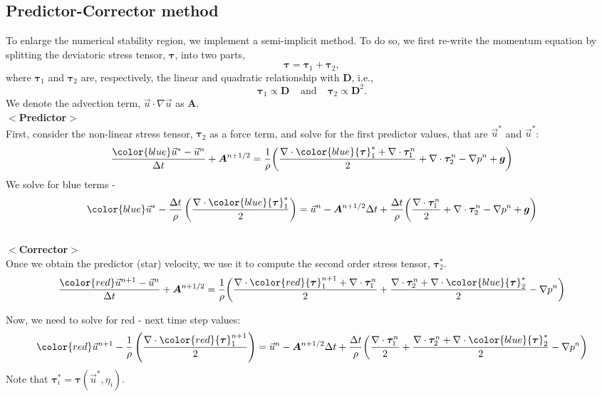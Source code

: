 \subsection{Predictor-Corrector method}
To enlarge the numerical stability region, we implement a semi-implicit method. To do so, we first re-write the momentum equation by splitting the deviatoric stress tensor, ${\bm \tau}$, into two parts, 
\[
 {\bm \tau}= {\bm \tau_1} + {\bm \tau_2},
\] 
where ${\bm \tau_1}$ and ${\bm \tau_2}$ are, respectively, the linear and quadratic relationship with ${\bm D}$, i.e., 
\[
  {\boldsymbol \tau_1} \propto \boldsymbol{D}
  \ \ \ \ \ \text{and}
   \ \ \ \ \ 
{\boldsymbol \tau_2} \propto {\boldsymbol D^2}.
\]
We denote the advection term, $\vec{u} \cdot \nabla \vec{u}$ as ${\bm A}$. 
\\
$<${\bf Predictor}$>$
\\
First, consider the non-linear stress tensor, ${\bm \tau_2}$ as a force term, and solve for the first predictor values, that are $\vec{u}^*$ and $\vec{u}^*$:
\[
\frac{{\color{blue}\vec{u}^*} - \vec{u}^n}{\Delta t} 
+  {\bm A}^{n+1/2} 
= \frac{1}{\rho}  \biggl(
\frac{\nabla \cdot {\color{blue}{\bm \tau}_1^*} + \nabla \cdot{\bm \tau}_1^n}{2} 
+ \nabla \cdot {\bm \tau}_2^n 
- \nabla p^n
+{\bm g}
\biggr)
\]
We solve for blue terms - 
\[
{\color{blue}\vec{u}^*} -
\frac{\Delta t}{\rho} 
\left( 
\frac{\nabla \cdot {\color{blue}{\bm \tau}_1^*}}{2}
\right)
=
\vec{u}^n
- {\bm A}^{n+1/2} \Delta t
+ \frac{\Delta t}{\rho} \biggl(
\frac{ \nabla \cdot{\bm \tau}_1^n}{2} 
+ \nabla \cdot {\bm \tau}_2^n 
- \nabla p^n
+{\bm g}
\biggr)
\]
\\
$<${\bf Corrector}$>$
\\
Once we obtain the predictor (star) velocity, we use it to compute the second order stress tensor, ${\bm \tau}_2^*$.
\[
\frac{{\color{red}\vec{u}^{n+1}} - \vec{u}^n}{\Delta t} 
+  {\bm A}^{n+1/2} 
=  \frac{1}{\rho}  \biggl(
\frac{\nabla \cdot {\color{red}{\bm \tau}_1^{n+1}} + \nabla \cdot{\bm \tau}_1^n}{2} 
+ \frac{\nabla \cdot {\bm \tau}_2^{n} + \nabla \cdot {\color{blue}{\bm \tau}_2^*}}{2} 
- \nabla p^n
\biggr)
\]

Now, we need to solve for red - next time step values:
\[
{\color{red}\vec{u}^{n+1}} 
-\frac{1}{\rho} 
\left(
\frac{\nabla \cdot {\color{red}{\bm \tau}_1^{n+1}}}{2}
\right)
=
\vec{u}^n 
 -{\bm A}^{n+1/2} \Delta t
 +\frac{\Delta t}{\rho}  \biggl(
\frac{ \nabla \cdot{\bm \tau}_1^n}{2} 
+ \frac{\nabla \cdot {\bm \tau}_2^{n} + \nabla \cdot {\color{blue}{\bm \tau}_2^*}}{2} 
- \nabla p^n
\biggr)
\]
Note that ${\bm \tau}_i^* = {\bm \tau}(\vec{u}^*, \eta_i)$.





